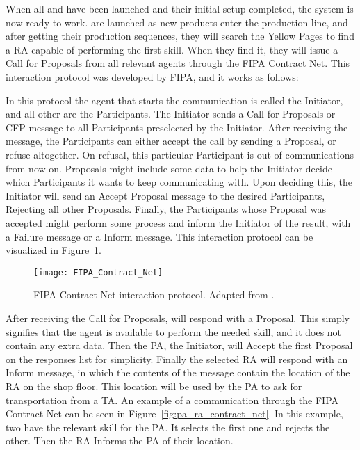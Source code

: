 When all  and  have been launched and their initial setup completed, the system is now ready to work.  are launched as new products enter the production line, and after getting their production sequences, they will search the Yellow Pages to find a \acrshort{RA} capable of performing the first skill. When they find it, they will issue a Call for Proposals from all relevant agents through the \acrshort{FIPA} Contract Net. This interaction protocol was developed by \acrshort{FIPA}, and it works as follows:

In this protocol the agent that starts the communication is called the Initiator, and all other are the Participants. The Initiator sends a Call for Proposals or CFP message to all Participants preselected by the Initiator. After receiving the message, the Participants can either accept the call by sending a Proposal, or refuse altogether. On refusal, this particular Participant is out of communications from now on. Proposals might include some data to help the Initiator decide which Participants it wants to keep communicating with. Upon deciding this, the Initiator will send an Accept Proposal message to the desired Participants, Rejecting all other Proposals. Finally, the Participants whose Proposal was accepted might perform some process and inform the Initiator of the result, with a Failure message or a Inform message. This interaction protocol can be visualized in Figure~\ref{fig:contract_net_protocol}.

\begin{figure}[h!]
	\centering
	\texttt{[image: FIPA\_Contract\_Net]}
	\caption{\acrshort{FIPA} Contract Net interaction protocol. Adapted from \cite{FIPA_Contract_Net}.}
	\label{fig:contract_net_protocol}
\end{figure}

After receiving the Call for Proposals,  will respond with a Proposal. This simply signifies that the agent is available to perform the needed skill, and it does not contain any extra data. Then the \acrshort{PA}, the Initiator, will Accept the first Proposal on the responses list for simplicity. Finally the selected \acrshort{RA} will respond with an Inform message, in which the contents of the message contain the location of the \acrshort{RA} on the shop floor. This location will be used by the \acrshort{PA} to ask for transportation from a \acrshort{TA}. An example of a communication through the \acrshort{FIPA} Contract Net can be seen in Figure~\ref{fig:pa_ra_contract_net}. In this example, two  have the relevant skill for the \acrshort{PA}. It selects the first one and rejects the other. Then the \acrshort{RA} Informs the \acrshort{PA} of their location.\\

